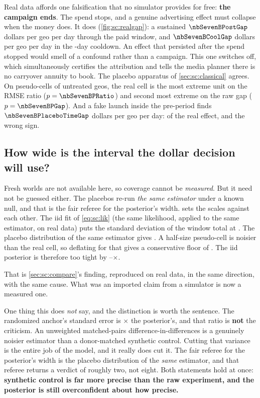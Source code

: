 Real data affords one falsification that no simulator provides for free: \textbf{the campaign
ends}. The spend stops, and a genuine advertising effect must collapse when the money does. It
does (\cref{fig:sc:realgap}): a sustained $\nbSevenBPostGap$ dollars per geo per day through the
paid window, and $\nbSevenBCoolGap$ dollars per geo per day in the \nbSevenBCooldownDays-day
cooldown. An effect that persisted after the spend stopped would smell of a confound rather than a
campaign. This one switches off, which simultaneously certifies the attribution and tells the
media planner there is no carryover annuity to book. The placebo apparatus of
\cref{sec:sc:classical} agrees. On \nbSevenBNPseudo{} pseudo-cells of untreated geos, the real
cell is the most extreme unit on the RMSE ratio ($p = \nbSevenBPRatio$) and second most extreme
on the raw gap ($p = \nbSevenBPGap$). And a fake launch inside the pre-period finds
$\nbSevenBPlaceboTimeGap$ dollars per geo per day: \pc{\nbSevenBPlaceboTimePct} of the real
effect, and the wrong sign.



\subsection*{How wide is the interval the dollar decision will use?}

Fresh worlds are not available here, so coverage cannot be \emph{measured}. But it need not be
guessed either. The placebos re-run \emph{the same estimator} under a known null, and that is the
fair referee for the posterior's width.  sets the scales against each
other. The iid fit of \cref{eq:sc:lik} (the same likelihood, applied to the same estimator, on
real data) puts the standard deviation of the window total at \kusd{\nbSevenBBayesSd}. The
placebo distribution of the same estimator gives \kusd{\nbSevenBPlaceboSd}. A half-size
pseudo-cell is noisier than the real cell, so deflating for that gives a conservative floor of
\kusd{\nbSevenBPlaceboSdFloor}. The iid posterior is therefore too tight by
\nbSevenBRatioPlaceboFloor--\nbSevenBRatioPlacebo$\times$.



That is \cref{sec:sc:compare}'s finding, reproduced on real data, in the same direction, with the
same cause. What was an imported claim from a simulator is now a measured one.

One thing this does \emph{not} say, and the distinction is worth the sentence. The randomized
anchor's standard error is \nbSevenBRatioAnchor$\times$ the posterior's, and that ratio is
\textbf{not} the criticism. An unweighted matched-pairs difference-in-differences is a genuinely
noisier estimator than a donor-matched synthetic control. Cutting that variance is the entire job
of the model, and it really does cut it. The fair referee for the posterior's width is the placebo
distribution of the \emph{same} estimator, and that referee returns a verdict of roughly two, not
eight. Both statements hold at once: \textbf{synthetic control is far more precise than the raw
experiment, and the posterior is still overconfident about how precise.}

